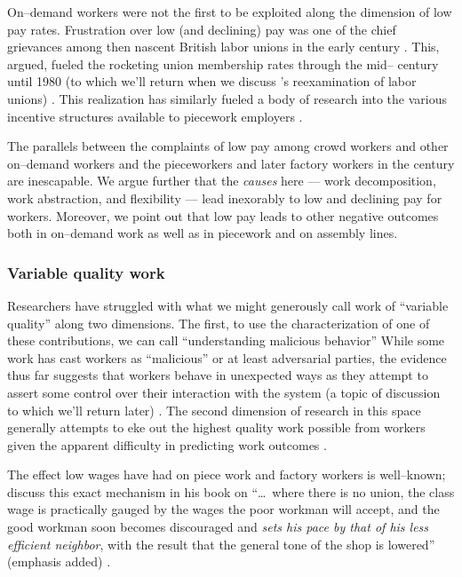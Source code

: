 \documentclass[trackingWork]{subfiles}
\begin{document}
{    On--demand workers were not the first to be exploited along the dimension of low pay rates.
    Frustration over low (and declining) pay was one of the chief grievances among then nascent
    British labor unions in the early  century
    \cite{turner1952trade}.
    This, \citeauthor{ebbinghaus1999institutions} argued,      fueled the rocketing union membership rates through the mid-- century until 1980
    (to which we'll return when we discuss \citeauthor{levi2009union}'s reexamination of labor unions)
    \cite{ebbinghaus1999institutions,levi2009union}.
    This realization has similarly fueled a body of research into
    the various incentive structures available to piecework employers
    \cite{roy1953work}.


    The parallels between the complaints of low pay among crowd workers and other on--demand workers
    and the pieceworkers and later factory workers in the  century
    are inescapable.
    We argue further that the \textit{causes} here
    --- work decomposition,      work abstraction, and
    flexibility ---
    lead inexorably to low and declining pay for workers.
    Moreover, we point out that low pay leads to other negative outcomes both
    in on--demand work
    as well as
    in piecework and on assembly lines.

    \subsubsection{Variable quality work}
    Researchers have struggled with what we might generously call work of ``variable quality''
    along two dimensions.
    The first, to use the characterization of one of these contributions, we can call
    ``understanding malicious behavior''
    \cite{MaliciousCrowdworkersGadiraju}
    While some work has cast workers as ``malicious'' or at least adversarial parties,      the evidence thus far suggests that
    workers behave in unexpected ways as they attempt to assert some control over their interaction with the system
    (a topic of discussion to which we'll return later)
    \cite{uberAlgorithm}.
    The second dimension of research in this space generally attempts
    to eke out the highest quality work possible from workers
    given the apparent difficulty in predicting work outcomes
    \cite{embracingErrorKrishna}.



    The effect low wages have had on piece work and factory workers is well--known;
    \citeauthor{gantt1913work} discuss this exact mechanism in his book on
    ``\dots~where there is no union,
         the class wage is practically gauged by the wages the poor workman will accept,
         and the good workman soon becomes discouraged and \textit{sets his pace by that of his less efficient neighbor},
         with the result that the general tone of the shop is lowered'' (emphasis added)
    \cite{gantt1913work}.

}
\end{document}
